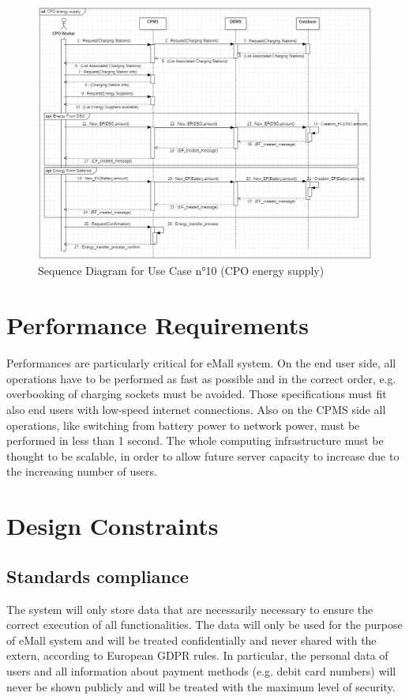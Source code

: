 \documentclass[a4paper]{report}
\begin{document}
\begin{figure}[p]
\includegraphics[width=\textwidth]{RASD/img/SD_EnergySupply_v2.png}
\caption{Sequence Diagram for Use Case n°10 (CPO energy supply)}
\label{fig:class-diagramRASD}
\end{figure}
\restoregeometry

\section{Performance Requirements}
Performances are particularly critical for eMall system. On the end user side, all operations have to be performed as fast as possible and in the correct order, e.g. overbooking of charging sockets must be avoided. Those specifications must fit also end users with low-speed internet connections. Also on the CPMS side all operations, like switching from battery power to network power, must be performed in less than 1 second. The whole computing infrastructure must be thought to be scalable, in order to allow future server capacity to increase due to the increasing number of users.

\section{Design Constraints}
\subsection{Standards compliance}
The system will only store data that are necessarily necessary to ensure the correct execution of all functionalities. The data will only be used for the purpose of eMall system and will be treated confidentially and never shared with the extern, according to European GDPR rules. In particular, the personal data of users and all information about payment methods (e.g. debit card numbers) will never be shown publicly and will be treated with the maximum level of security.
\end{document}
